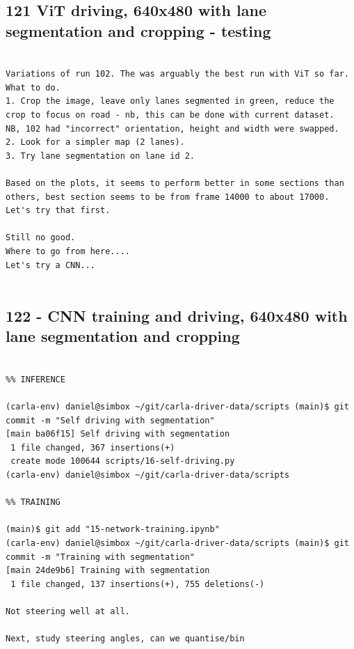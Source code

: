 \subsection{121 ViT driving, 640x480 with lane segmentation and cropping - testing}
\label{app_res:121}

\begin{verbatim}

Variations of run 102. The was arguably the best run with ViT so far.
What to do.
1. Crop the image, leave only lanes segmented in green, reduce the crop to focus on road - nb, this can be done with current dataset.
NB, 102 had "incorrect" orientation, height and width were swapped.
2. Look for a simpler map (2 lanes).
3. Try lane segmentation on lane id 2.    

Based on the plots, it seems to perform better in some sections than others, best section seems to be from frame 14000 to about 17000. Let's try that first.

Still no good.
Where to go from here....
Let's try a CNN...


\end{verbatim}

\subsection{122 - CNN training and driving, 640x480 with lane segmentation and cropping}
\label{app_res:122}

\begin{verbatim}

%% INFERENCE

(carla-env) daniel@simbox ~/git/carla-driver-data/scripts (main)$ git commit -m "Self driving with segmentation"
[main ba06f15] Self driving with segmentation
 1 file changed, 367 insertions(+)
 create mode 100644 scripts/16-self-driving.py
(carla-env) daniel@simbox ~/git/carla-driver-data/scripts 

%% TRAINING

(main)$ git add "15-network-training.ipynb"
(carla-env) daniel@simbox ~/git/carla-driver-data/scripts (main)$ git commit -m "Training with segmentation"
[main 24de9b6] Training with segmentation
 1 file changed, 137 insertions(+), 755 deletions(-)

Not steering well at all.

Next, study steering angles, can we quantise/bin

\end{verbatim}

